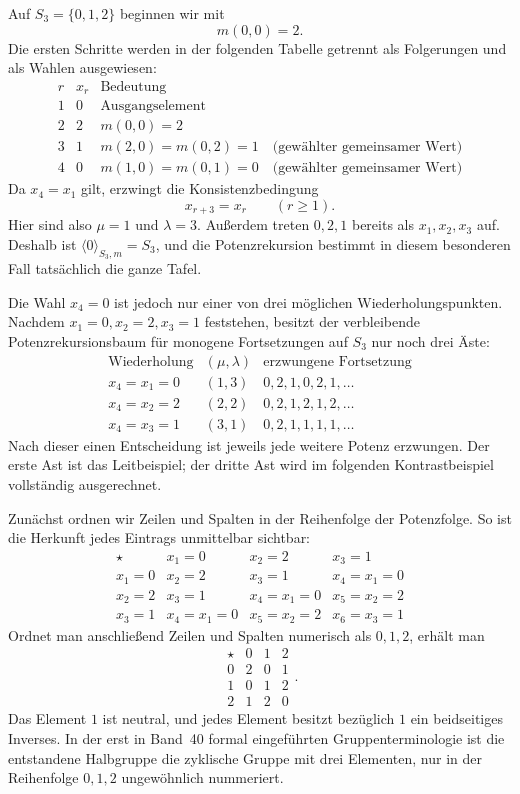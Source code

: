 \documentclass[main.tex]{subfiles}
\begin{document}
Auf \(S_3=\{0,1,2\}\) beginnen wir mit
\[
  m(0,0)=2.
\]
Die ersten Schritte werden in der folgenden Tabelle getrennt als
Folgerungen und als Wahlen ausgewiesen:
\[
\begin{array}{c|c|l}
r&x_r&\text{Bedeutung}\\\hline
1&0&\text{Ausgangselement}\\
2&2&m(0,0)=2\\
3&1&m(2,0)=m(0,2)=1\quad\text{(gewählter gemeinsamer Wert)}\\
4&0&m(1,0)=m(0,1)=0\quad\text{(gewählter gemeinsamer Wert)}
\end{array}
\]
Da \(x_4=x_1\) gilt, erzwingt die Konsistenzbedingung
\[
  x_{r+3}=x_r
  \qquad(r\geq1).
\]
Hier sind also \(\mu=1\) und \(\lambda=3\).  Außerdem treten \(0,2,1\)
bereits als \(x_1,x_2,x_3\) auf.  Deshalb ist
\(\langle0\rangle_{S_3,m}=S_3\), und die Potenzrekursion bestimmt in diesem
besonderen Fall tatsächlich die ganze Tafel.

Die Wahl \(x_4=0\) ist jedoch nur einer von drei möglichen
Wiederholungspunkten.  Nachdem \(x_1=0,x_2=2,x_3=1\) feststehen, besitzt der
verbleibende Potenzrekursionsbaum für monogene Fortsetzungen auf \(S_3\) nur
noch drei Äste:
\[
\begin{array}{c|c|c}
\text{Wiederholung}&(\mu,\lambda)&\text{erzwungene Fortsetzung}\\\hline
x_4=x_1=0&(1,3)&0,2,1,0,2,1,\ldots\\
x_4=x_2=2&(2,2)&0,2,1,2,1,2,\ldots\\
x_4=x_3=1&(3,1)&0,2,1,1,1,1,\ldots
\end{array}
\]
Nach dieser einen Entscheidung ist jeweils jede weitere Potenz erzwungen.
Der erste Ast ist das Leitbeispiel; der dritte Ast wird im folgenden
Kontrastbeispiel vollständig ausgerechnet.

Zunächst ordnen wir Zeilen und Spalten in der Reihenfolge der Potenzfolge.
So ist die Herkunft jedes Eintrags unmittelbar sichtbar:
\[
\boxed{
\begin{array}{c|ccc}
\star&x_1=0&x_2=2&x_3=1\\\hline
x_1=0&x_2=2&x_3=1&x_4=x_1=0\\
x_2=2&x_3=1&x_4=x_1=0&x_5=x_2=2\\
x_3=1&x_4=x_1=0&x_5=x_2=2&x_6=x_3=1
\end{array}}
\]
Ordnet man anschließend Zeilen und Spalten numerisch als \(0,1,2\), erhält
man
\[
\begin{array}{c|ccc}
\star&0&1&2\\\hline
0&2&0&1\\
1&0&1&2\\
2&1&2&0
\end{array}.
\]
Das Element \(1\) ist neutral, und jedes Element besitzt bezüglich \(1\) ein
beidseitiges Inverses.  In der erst in Band~40 formal eingeführten
Gruppenterminologie ist die entstandene Halbgruppe die zyklische Gruppe mit
drei Elementen, nur in der Reihenfolge \(0,1,2\) ungewöhnlich nummeriert.
\end{document}
